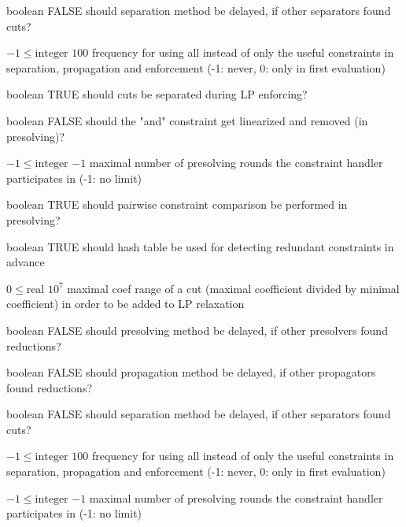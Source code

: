 %
{boolean}%
{FALSE}%
{should separation method be delayed, if other separators found cuts?}%
{}

%
{$-1\leq\textrm{integer}$}%
{$100$}%
{frequency for using all instead of only the useful constraints in separation, propagation and enforcement (-1: never, 0: only in first evaluation)}%
{}

%
{boolean}%
{TRUE}%
{should cuts be separated during LP enforcing?}%
{}

%
{boolean}%
{FALSE}%
{should the "and" constraint get linearized and removed (in presolving)?}%
{}

%
{$-1\leq\textrm{integer}$}%
{$-1$}%
{maximal number of presolving rounds the constraint handler participates in (-1: no limit)}%
{}

%
{boolean}%
{TRUE}%
{should pairwise constraint comparison be performed in presolving?}%
{}

%
{boolean}%
{TRUE}%
{should hash table be used for detecting redundant constraints in advance}%
{}

%
{$0\leq\textrm{real}$}%
{$10^{  7}$}%
{maximal coef range of a cut (maximal coefficient divided by minimal coefficient) in order to be added to LP relaxation}%
{}

%
{boolean}%
{FALSE}%
{should presolving method be delayed, if other presolvers found reductions?}%
{}

%
{boolean}%
{FALSE}%
{should propagation method be delayed, if other propagators found reductions?}%
{}

%
{boolean}%
{FALSE}%
{should separation method be delayed, if other separators found cuts?}%
{}

%
{$-1\leq\textrm{integer}$}%
{$100$}%
{frequency for using all instead of only the useful constraints in separation, propagation and enforcement (-1: never, 0: only in first evaluation)}%
{}

%
{$-1\leq\textrm{integer}$}%
{$-1$}%
{maximal number of presolving rounds the constraint handler participates in (-1: no limit)}%
{}

